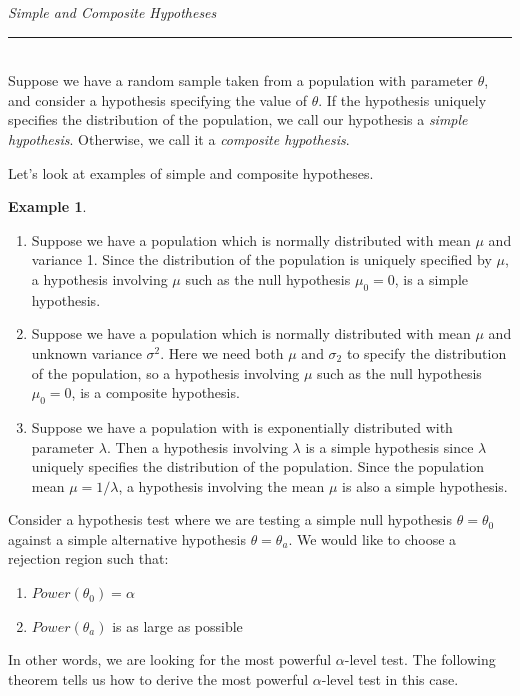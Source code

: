 \documentclass[12pt]{article}
\theoremstyle{definition}
\newtheorem*{example}{Example}
\theoremstyle{remark}
\begin{document}
\begin{framed}
\emph{Simple and Composite Hypotheses}\\
  \rule{\dimexpr{}\fboxrule}{.1pt} \\
Suppose we have a random sample taken from a population with parameter $\theta$, and consider a hypothesis specifying the value of $\theta$. If the hypothesis uniquely specifies the distribution of the population, we call our hypothesis a \emph{simple hypothesis}. Otherwise, we call it a \emph{composite hypothesis}.
\end{framed}
Let's look at examples of simple and composite hypotheses.
\begin{example}
\begin{enumerate}
\item Suppose we have a population which is normally distributed with mean $\mu$ and variance 1. Since the distribution of the population is uniquely specified by $\mu$, a hypothesis involving $\mu$ such as the null hypothesis $\mu_0 = 0$, is a simple hypothesis.
\item Suppose we have a population which is normally distributed with mean $\mu$ and unknown variance $\sigma^2$. Here we need both $\mu$ and $\sigma_2$ to specify the distribution of the population, so a hypothesis involving $\mu$ such as the null hypothesis $\mu_0 = 0$, is a composite hypothesis.
\item Suppose we have a population with is exponentially distributed with parameter $\lambda$. Then a hypothesis involving $\lambda$ is a simple hypothesis since $\lambda$ uniquely specifies the distribution of the population. Since the population mean $\mu = 1 / \lambda$, a hypothesis involving the mean $\mu$ is also a simple hypothesis.
\end{enumerate}
\end{example}
Consider a hypothesis test where we are testing a simple null hypothesis $\theta = \theta_0$ against a simple alternative hypothesis $\theta = \theta_a$. We would like to choose a rejection region such that:
\begin{enumerate}
\item $Power(\theta_0) = \alpha$
\item $Power(\theta_a)$ is as large as possible
\end{enumerate}
In other words, we are looking for the most powerful $\alpha$-level test. The following theorem tells us how to derive the most powerful $\alpha$-level test in this case.
\end{document}
